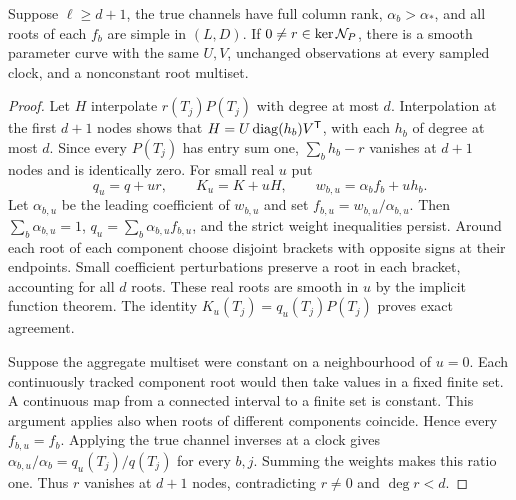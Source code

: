 \begin{lemma}\label{lem:local-fibre}
Suppose $\ell\ge d+1$, the true channels have full column rank,
$\alpha_b>\alpha_*$, and all roots of each $f_b$ are simple in $(L,D)$.
If $0\ne r\in\ker\mathcal N_P$, there is a smooth parameter curve with the
same $U,V$, unchanged observations at every sampled clock, and a
nonconstant root multiset.
\end{lemma}
\begin{proof}
Let $H$ interpolate $r(T_j)P(T_j)$ with degree at most $d$. Interpolation
at the first $d+1$ nodes shows that
$H=U\operatorname{diag}(h_b)V^{\mathsf T}$, with each $h_b$ of degree at most $d$.
Since every $P(T_j)$ has entry sum one, $\sum_bh_b-r$ vanishes at
$d+1$ nodes and is identically zero. For small real $u$ put
\[
 q_u=q+ur,\qquad K_u=K+uH,\qquad
 w_{b,u}=\alpha_bf_b+uh_b.
\]
Let $\alpha_{b,u}$ be the leading coefficient of $w_{b,u}$ and set
$f_{b,u}=w_{b,u}/\alpha_{b,u}$. Then $\sum_b\alpha_{b,u}=1$,
$q_u=\sum_b\alpha_{b,u}f_{b,u}$, and the strict weight inequalities
persist. Around each root of each component choose disjoint brackets
with opposite signs at their endpoints. Small coefficient perturbations
preserve a root in each bracket, accounting for all $d$ roots. These
real roots are smooth in $u$ by the implicit function theorem.
The identity $K_u(T_j)=q_u(T_j)P(T_j)$ proves exact agreement.

Suppose the aggregate multiset were constant on a neighbourhood of
$u=0$. Each continuously tracked component root would then take values
in a fixed finite set. A continuous map from a connected interval to
a finite set is constant. This argument applies also when roots of
different components coincide. Hence every $f_{b,u}=f_b$.
Applying the true channel inverses at a clock gives
$\alpha_{b,u}/\alpha_b=q_u(T_j)/q(T_j)$ for every $b,j$.
Summing the weights makes this ratio one. Thus $r$ vanishes at $d+1$
nodes, contradicting $r\ne0$ and $\deg r<d$.
\end{proof}

